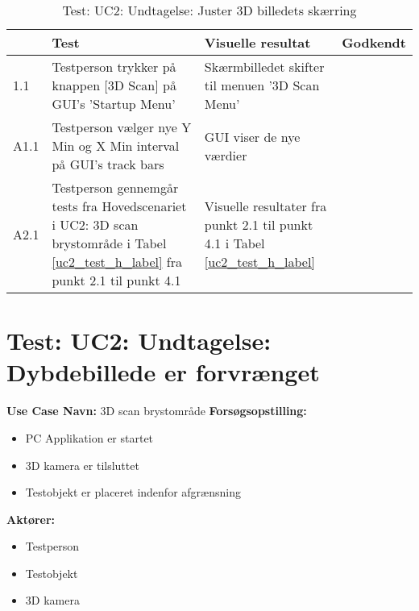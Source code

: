 \begin{table}[htb]
\begin{tabularx}{\textwidth}{|p{0.7cm}|X|X|p{2cm}|}
\hline
\textbf{} & \textbf{Test} & \textbf{Visuelle resultat} &\textbf{Godkendt} \\\hline
1.1 & Testperson trykker på knappen [3D Scan] på GUI's 'Startup Menu' & Skærmbilledet skifter til menuen '3D Scan Menu' &  \\\hline
A1.1 & Testperson vælger nye Y Min og X Min interval på GUI's track bars & GUI viser de nye værdier & \\\hline
A2.1 & Testperson gennemgår tests fra Hovedscenariet i UC2: 3D scan brystområde i Tabel \ref{uc2_test_h_label} fra punkt 2.1 til punkt 4.1  & Visuelle resultater fra punkt 2.1 til punkt 4.1 i Tabel  \ref{uc2_test_h_label} & \\\hline
\end{tabularx}
    \caption{Test: UC2: Undtagelse: Juster 3D billedets skærring}
    \label{uc2_test_e_1_label}  
\end{table}
\newpage


\section{Test: UC2: Undtagelse: Dybdebillede er forvrænget}
\textbf{Use Case Navn:} 3D scan brystområde \newline
\textbf{Forsøgsopstilling:}
\begin{itemize}
\item PC Applikation er startet
\item 3D kamera er tilsluttet
\item Testobjekt er placeret indenfor afgrænsning 
\end{itemize}  
\textbf{Aktører:}
\begin{itemize}
\item Testperson
\item Testobjekt
\item 3D kamera
\end{itemize}  

